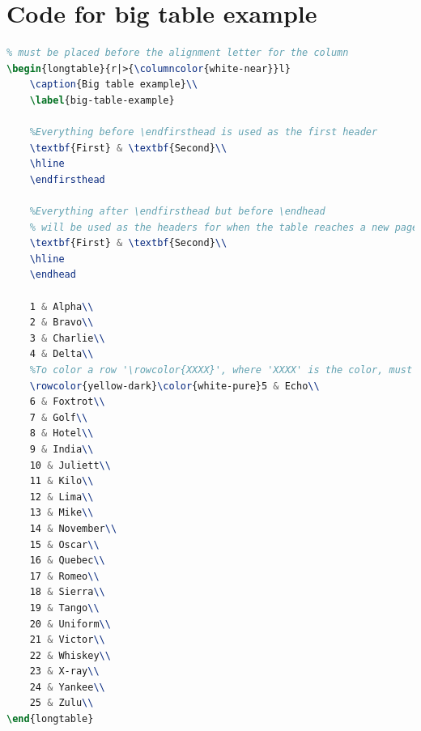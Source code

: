 \section{Code for big table example}
\label{code-big-table-example}

\begin{lstlisting}[language=tex]
%To color a column '>{\columncolor{XXXX}}', where 'XXXX' is the color,
% must be placed before the alignment letter for the column
\begin{longtable}{r|>{\columncolor{white-near}}l}
    \caption{Big table example}\\
    \label{big-table-example}

    %Everything before \endfirsthead is used as the first header
    \textbf{First} & \textbf{Second}\\
    \hline
    \endfirsthead

    %Everything after \endfirsthead but before \endhead
    % will be used as the headers for when the table reaches a new page.
    \textbf{First} & \textbf{Second}\\
    \hline
    \endhead
    
    1 & Alpha\\
    2 & Bravo\\
    3 & Charlie\\
    4 & Delta\\
    %To color a row '\rowcolor{XXXX}', where 'XXXX' is the color, must prefix the row.
    \rowcolor{yellow-dark}\color{white-pure}5 & Echo\\
    6 & Foxtrot\\
    7 & Golf\\
    8 & Hotel\\
    9 & India\\
    10 & Juliett\\
    11 & Kilo\\
    12 & Lima\\
    13 & Mike\\
    14 & November\\
    15 & Oscar\\
    16 & Quebec\\
    17 & Romeo\\
    18 & Sierra\\
    19 & Tango\\
    20 & Uniform\\
    21 & Victor\\
    22 & Whiskey\\
    23 & X-ray\\
    24 & Yankee\\
    25 & Zulu\\
\end{longtable}
\end{lstlisting}


